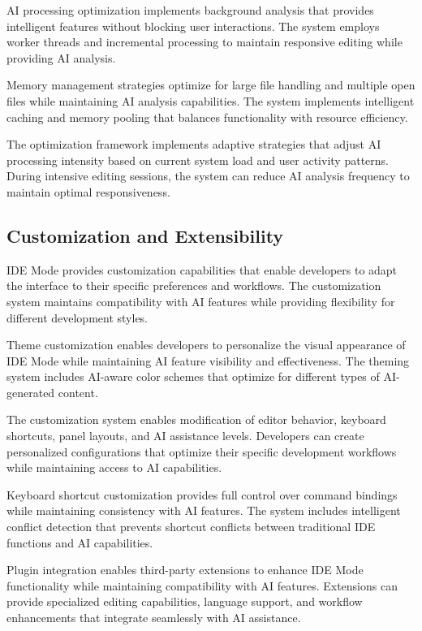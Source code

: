 AI processing optimization implements background analysis that provides intelligent features without blocking user interactions. The system employs worker threads and incremental processing to maintain responsive editing while providing AI analysis.

Memory management strategies optimize for large file handling and multiple open files while maintaining AI analysis capabilities. The system implements intelligent caching and memory pooling that balances functionality with resource efficiency.

The optimization framework implements adaptive strategies that adjust AI processing intensity based on current system load and user activity patterns. During intensive editing sessions, the system can reduce AI analysis frequency to maintain optimal responsiveness.

\subsection*{Customization and Extensibility}

IDE Mode provides customization capabilities that enable developers to adapt the interface to their specific preferences and workflows. The customization system maintains compatibility with AI features while providing flexibility for different development styles.

Theme customization enables developers to personalize the visual appearance of IDE Mode while maintaining AI feature visibility and effectiveness. The theming system includes AI-aware color schemes that optimize for different types of AI-generated content.

\begin{infobox}[title=Customization Features]
The customization system enables modification of editor behavior, keyboard shortcuts, panel layouts, and AI assistance levels. Developers can create personalized configurations that optimize their specific development workflows while maintaining access to AI capabilities.
\end{infobox}

Keyboard shortcut customization provides full control over command bindings while maintaining consistency with AI features. The system includes intelligent conflict detection that prevents shortcut conflicts between traditional IDE functions and AI capabilities.

Plugin integration enables third-party extensions to enhance IDE Mode functionality while maintaining compatibility with AI features. Extensions can provide specialized editing capabilities, language support, and workflow enhancements that integrate seamlessly with AI assistance.


